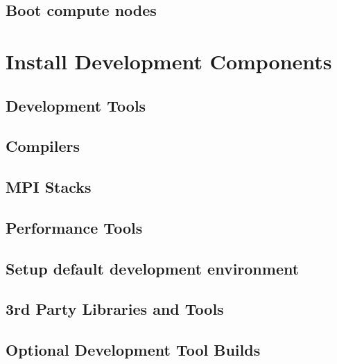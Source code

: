 \documentclass[letterpaper]{article}
\begin{document}
\subsection{Boot compute nodes} \label{sec:boot_computes}


\section{Install \OHPC{} Development Components}


\subsection{Development Tools} \label{sec:install_dev_tools}


\subsection{Compilers} \label{sec:install_compilers}


\subsection{MPI Stacks} \label{sec:mpi}


\subsection{Performance Tools} \label{sec:install_perf_tools}


\subsection{Setup default development environment}


\subsection{3rd Party Libraries and Tools} \label{sec:3rdparty}





\subsection{Optional Development Tool Builds} \label{sec:3rdparty_intel}

\end{document}

